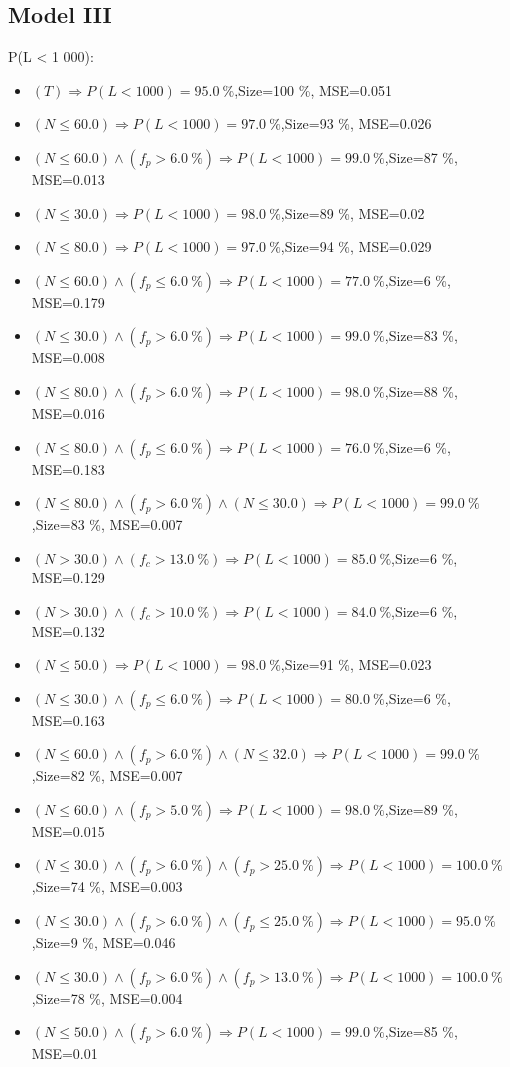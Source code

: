 \documentclass[numbered]{CSL}
\begin{document}
\subsection{Model III}
P(L < 1 000):
\begin{itemize}
\item $(T) \Rightarrow P(L < 1 000) = 95.0~\%$,\hfill Size=100 \%, MSE=0.051
\item $(N \leq 60.0) \Rightarrow P(L < 1 000) = 97.0~\%$,\hfill Size=93 \%, MSE=0.026
\item $(N \leq 60.0) \land (f_p > 6.0~\%) \Rightarrow P(L < 1 000) = 99.0~\%$,\hfill Size=87 \%, MSE=0.013
\item $(N \leq 30.0) \Rightarrow P(L < 1 000) = 98.0~\%$,\hfill Size=89 \%, MSE=0.02
\item $(N \leq 80.0) \Rightarrow P(L < 1 000) = 97.0~\%$,\hfill Size=94 \%, MSE=0.029
\item $(N \leq 60.0) \land (f_p \leq 6.0~\%) \Rightarrow P(L < 1 000) = 77.0~\%$,\hfill Size=6 \%, MSE=0.179
\item $(N \leq 30.0) \land (f_p > 6.0~\%) \Rightarrow P(L < 1 000) = 99.0~\%$,\hfill Size=83 \%, MSE=0.008
\item $(N \leq 80.0) \land (f_p > 6.0~\%) \Rightarrow P(L < 1 000) = 98.0~\%$,\hfill Size=88 \%, MSE=0.016
\item $(N \leq 80.0) \land (f_p \leq 6.0~\%) \Rightarrow P(L < 1 000) = 76.0~\%$,\hfill Size=6 \%, MSE=0.183
\item $(N \leq 80.0) \land (f_p > 6.0~\%) \land (N \leq 30.0) \Rightarrow P(L < 1 000) = 99.0~\%$,\hfill Size=83 \%, MSE=0.007
\item $(N > 30.0) \land (f_c > 13.0~\%) \Rightarrow P(L < 1 000) = 85.0~\%$,\hfill Size=6 \%, MSE=0.129
\item $(N > 30.0) \land (f_c > 10.0~\%) \Rightarrow P(L < 1 000) = 84.0~\%$,\hfill Size=6 \%, MSE=0.132
\item $(N \leq 50.0) \Rightarrow P(L < 1 000) = 98.0~\%$,\hfill Size=91 \%, MSE=0.023
\item $(N \leq 30.0) \land (f_p \leq 6.0~\%) \Rightarrow P(L < 1 000) = 80.0~\%$,\hfill Size=6 \%, MSE=0.163
\item $(N \leq 60.0) \land (f_p > 6.0~\%) \land (N \leq 32.0) \Rightarrow P(L < 1 000) = 99.0~\%$,\hfill Size=82 \%, MSE=0.007
\item $(N \leq 60.0) \land (f_p > 5.0~\%) \Rightarrow P(L < 1 000) = 98.0~\%$,\hfill Size=89 \%, MSE=0.015
\item $(N \leq 30.0) \land (f_p > 6.0~\%) \land (f_p > 25.0~\%) \Rightarrow P(L < 1 000) = 100.0~\%$,\hfill Size=74 \%, MSE=0.003
\item $(N \leq 30.0) \land (f_p > 6.0~\%) \land (f_p \leq 25.0~\%) \Rightarrow P(L < 1 000) = 95.0~\%$,\hfill Size=9 \%, MSE=0.046
\item $(N \leq 30.0) \land (f_p > 6.0~\%) \land (f_p > 13.0~\%) \Rightarrow P(L < 1 000) = 100.0~\%$,\hfill Size=78 \%, MSE=0.004
\item $(N \leq 50.0) \land (f_p > 6.0~\%) \Rightarrow P(L < 1 000) = 99.0~\%$,\hfill Size=85 \%, MSE=0.01
\end{itemize}
\end{document}
